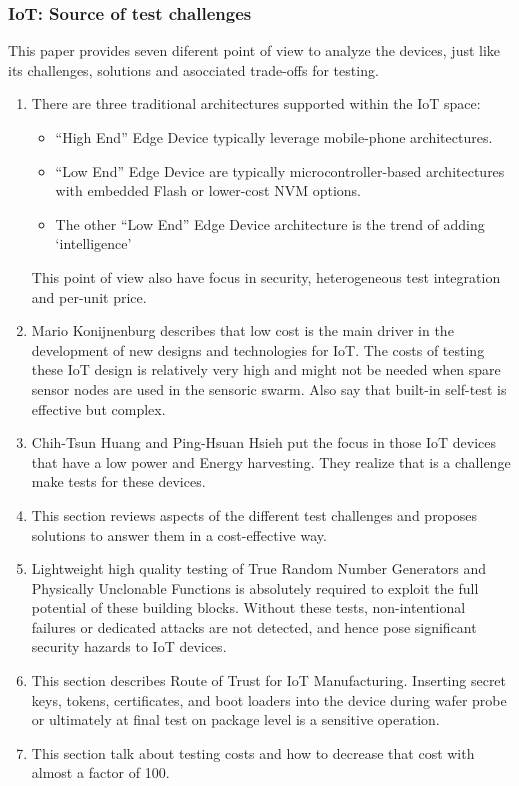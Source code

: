\subsubsection{IoT: Source of test challenges}\cite{Paper4}
This paper provides seven diferent point of view to analyze the \IoT devices, just like its challenges, solutions and asocciated trade-offs for testing.
\begin{enumerate}
	\item There are three traditional architectures supported within the IoT space:
	\begin{itemize}
		\item ``High End'' Edge Device typically leverage mobile-phone architectures.
		\item ``Low End'' Edge Device are typically microcontroller-based architectures with embedded Flash or lower-cost NVM options.
		\item The other ``Low End'' Edge Device architecture is the trend of adding `intelligence'
	\end{itemize}
	This point of view also have focus in security, heterogeneous test integration and per-unit price.
	
	\item Mario Konijnenburg describes that low cost is the main driver in the development of new designs and technologies for IoT. The costs of testing these IoT design is relatively very high and might not be needed when spare sensor nodes are used in the sensoric swarm. Also say that built-in self-test is effective but complex.
	
	\item  Chih-Tsun Huang and Ping-Hsuan Hsieh put the focus in those IoT devices that have a low power and Energy harvesting. They realize that is a challenge make tests for these devices.
	
	\item This section reviews aspects of the different test challenges and proposes solutions to answer them in a cost-effective way. 
	
	\item Lightweight high quality testing of True Random Number Generators and Physically Unclonable Functions is absolutely required to exploit the full potential of these building blocks. Without these tests, non-intentional failures or dedicated attacks are not detected, and hence pose significant security hazards to IoT devices.
	
	\item This section describes Route of Trust for IoT Manufacturing. Inserting secret keys, tokens, certificates, and boot loaders into the device during wafer probe or ultimately at final test on package level is a sensitive operation.
	
	\item This section talk about testing costs and how to decrease that cost with almost a factor of 100.\\
\end{enumerate}

